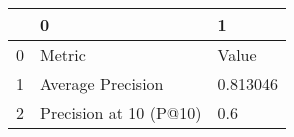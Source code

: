 \begin{tabular}{lll}
\toprule
{} &                       0 &         1 \\
\midrule
0 &                  Metric &     Value \\
1 &       Average Precision &  0.813046 \\
2 &  Precision at 10 (P@10) &       0.6 \\
\bottomrule
\end{tabular}
